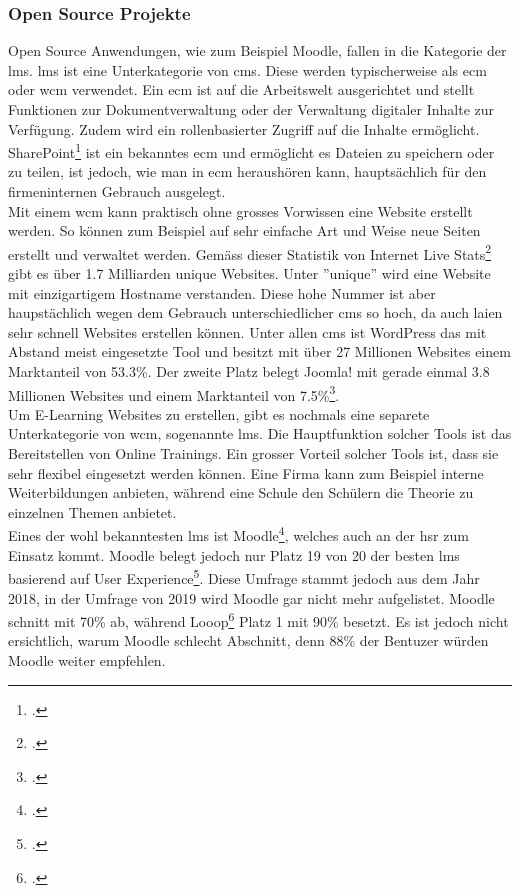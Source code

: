\subsubsection*{Open Source Projekte}
Open Source Anwendungen, wie zum Beispiel Moodle, fallen in die Kategorie der \gls{lms}. \gls{lms} ist eine Unterkategorie von \gls{cms}. Diese werden typischerweise als \gls{ecm} oder \gls{wcm} verwendet. Ein \gls{ecm} ist auf die Arbeitswelt ausgerichtet und stellt Funktionen zur Dokumentverwaltung oder der Verwaltung digitaler Inhalte zur Verfügung. Zudem wird ein rollenbasierter Zugriff auf die Inhalte ermöglicht. SharePoint\footcite{sharepoint} ist ein bekanntes \gls{ecm} und ermöglicht es Dateien zu speichern oder zu teilen, ist jedoch, wie man in \gls{ecm} heraushören kann, hauptsächlich für den firmeninternen Gebrauch ausgelegt. \\

Mit einem \gls{wcm} kann praktisch ohne grosses Vorwissen eine Website erstellt werden. So können zum Beispiel auf sehr einfache Art und Weise neue Seiten erstellt und verwaltet werden. Gemäss dieser Statistik von Internet Live Stats\footcite{internet_live_stats} gibt es über 1.7 Milliarden unique Websites. Unter ''unique'' wird eine Website mit einzigartigem Hostname verstanden. Diese hohe Nummer ist aber haupstächlich wegen dem Gebrauch unterschiedlicher \gls{cms} so hoch, da auch laien sehr schnell Websites erstellen können. Unter allen \gls{cms} ist WordPress das mit Abstand meist eingesetzte Tool und besitzt mit über 27 Millionen Websites einem Marktanteil von 53.3\%. Der zweite Platz belegt Joomla! mit gerade einmal 3.8 Millionen Websites und einem Marktanteil von 7.5\%\footcite{cms_market_share}.\\

Um E-Learning Websites zu erstellen, gibt es nochmals eine separete Unterkategorie von \gls{wcm}, sogenannte \gls{lms}. Die Hauptfunktion solcher Tools ist das Bereitstellen von Online Trainings. Ein grosser Vorteil solcher Tools ist, dass sie sehr flexibel eingesetzt werden können. Eine Firma kann zum Beispiel interne Weiterbildungen anbieten, während eine Schule den Schülern die Theorie zu einzelnen Themen anbietet. \\

Eines der wohl bekanntesten \gls{lms} ist Moodle\footcite{moodle_homepage}, welches auch an der \gls{hsr} zum Einsatz kommt. Moodle belegt jedoch nur Platz 19 von 20 der besten \gls{lms} basierend auf User Experience\footcite{moodle_ux}. Diese Umfrage stammt jedoch aus dem Jahr 2018, in der Umfrage von 2019 wird Moodle gar nicht mehr aufgelistet. Moodle schnitt mit 70\% ab, während Looop\footcite{looop_homepage} Platz 1 mit 90\% besetzt. Es ist jedoch nicht ersichtlich, warum Moodle schlecht Abschnitt, denn 88\% der Bentuzer würden Moodle weiter empfehlen.


